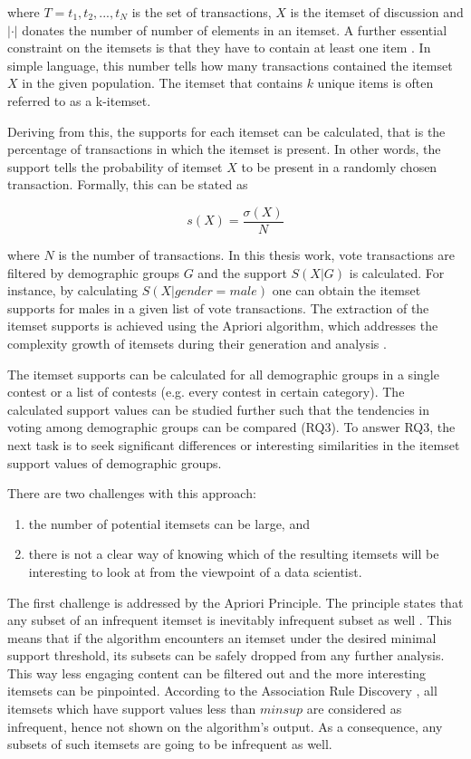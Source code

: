 where $T = {t_1, t_2, ..., t_N}$ is the set of transactions, $X$ is the itemset of discussion and $| \cdot |$ donates the number of number of elements in an itemset. A further essential constraint on the itemsets is that they have to contain at least one item \cite{introtodatamining}. In simple language, this number tells how many transactions contained the itemset $X$ in the given population. The itemset that contains $k$ unique items is often referred to as a k-itemset. 

Deriving from this, the supports for each itemset can be calculated, that is the percentage of transactions in which the itemset is present. In other words, the support tells the probability of itemset $X$ to be present in a randomly chosen transaction. Formally, this can be stated as 

\begin{equation}
    s(X) = \frac{\sigma (X)}{N}
\end{equation}

where $N$ is the number of transactions. In this thesis work, vote transactions are filtered by demographic groups $G$ and the support $S(X|G)$ is calculated. For instance, by calculating $S(X|gender = male)$ one can obtain the itemset supports for males in a given list of vote transactions. The extraction of the itemset supports is achieved using the Apriori algorithm, which addresses the complexity growth of itemsets during their generation and analysis \cite{introtodatamining}. 

The itemset supports can be calculated for all demographic groups in a single contest or a list of contests (e.g. every contest in certain category). The calculated support values can be studied further such that the tendencies in voting among demographic groups can be compared (RQ3). To answer RQ3, the next task is to seek significant differences or interesting similarities in the itemset support values of demographic groups. 

There are two challenges with this approach: 
\begin{enumerate}
    \item the number of potential itemsets can be large, and
    \item there is not a clear way of knowing which of the resulting itemsets will be interesting to look at from the viewpoint of a data scientist.
\end{enumerate} 

The first challenge is addressed by the Apriori Principle. The principle states that any subset of an infrequent itemset is inevitably infrequent subset as well \cite{introtodatamining}. This means that if the algorithm encounters an itemset under the desired minimal support threshold, its subsets can be safely dropped from any further analysis. This way less engaging content can be filtered out and the more interesting itemsets can be pinpointed. According to the Association Rule Discovery \cite{introtodatamining}, all itemsets which have support values less than $minsup$ are considered as infrequent, hence not shown on the algorithm's output. As a consequence, any subsets of such itemsets are going to be infrequent as well. 

